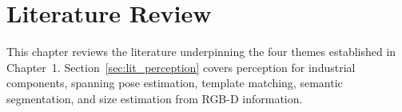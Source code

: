\chapter{Literature Review}
\label{chap:lit_review}

This chapter reviews the literature underpinning the four themes established in Chapter~1.
Section~\ref{sec:lit_perception} covers perception for industrial components, spanning pose
estimation, template matching, semantic segmentation, and size estimation from RGB-D information.